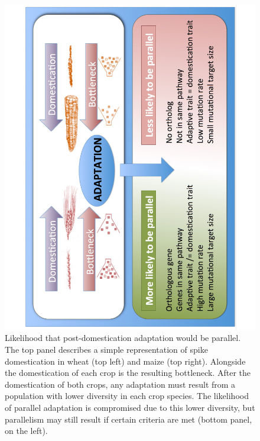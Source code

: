 \documentclass[12pt]{article}
\begin{document}
\begin{figure}[h]
    \centering
    \includegraphics[width=15cm]{parallel_adaptation2.pdf}
    \caption{Likelihood that post-domestication adaptation would be parallel. The top panel describes a simple representation of spike domestication in wheat (top left) and maize (top right). Alongside the domestication of each crop is the resulting bottleneck. After the domestication of both crops, any adaptation must result from a population with lower diversity in each crop species. The likelihood of parallel adaptation is compromised due to this lower diversity, but parallelism may still result if certain criteria are met (bottom panel, on the left). 
}
    \label{fig:adaptation}
\end{figure}
\end{document}
